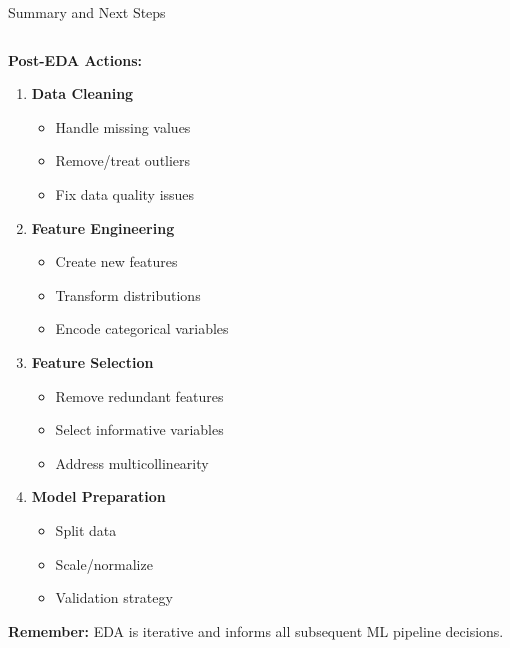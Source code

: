 \documentclass[8pt,aspectratio=1610]{beamer}
\begin{document}
\begin{frame}{Summary and Next Steps}
\begin{columns}[t]
\begin{column}{0.48\textwidth}
\textbf{Post-EDA Actions:}
\begin{enumerate}
\setlength{\itemsep}{1pt}
\item \textbf{Data Cleaning}
   \begin{itemize}
   \item Handle missing values
   \item Remove/treat outliers
   \item Fix data quality issues
   \end{itemize}
\item \textbf{Feature Engineering}
   \begin{itemize}
   \item Create new features
   \item Transform distributions
   \item Encode categorical variables
   \end{itemize}
\item \textbf{Feature Selection}
   \begin{itemize}
   \item Remove redundant features
   \item Select informative variables
   \item Address multicollinearity
   \end{itemize}
\item \textbf{Model Preparation}
   \begin{itemize}
   \item Split data
   \item Scale/normalize
   \item Validation strategy
   \end{itemize}
\end{enumerate}

\textbf{Remember:} EDA is iterative and informs all subsequent ML pipeline decisions.
\end{column}
\end{columns}
\end{frame}
\end{document}
